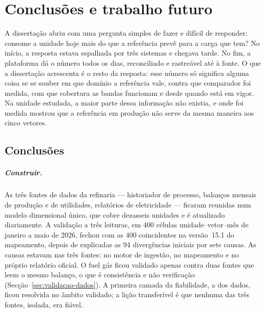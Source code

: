 
\chapter{Conclusões e trabalho futuro}
\label{cha:conclusoes}

A dissertação abriu com uma pergunta simples de fazer e difícil de
responder: consome a unidade hoje mais do que a referência prevê para a carga
que tem? No início, a resposta estava espalhada por três sistemas e chegava
tarde. No fim, a plataforma dá o número todos os dias, reconciliado e
rastreável até à fonte. O que a dissertação acrescenta é o resto da resposta:
esse número só significa alguma coisa se se souber em que domínio a
referência vale, contra que comparador foi medida, com que cobertura as
bandas funcionam e desde quando está em vigor. Na unidade estudada, a maior
parte dessa informação não existia, e onde foi medida mostrou que a
referência em produção não serve da mesma maneira aos cinco vetores.

\section{Conclusões}
\label{sec:conclusoes}

\paragraph{Construir.} As três fontes de dados da refinaria --- historiador
de processo, balanços mensais de produção e de utilidades, relatórios de
eletricidade --- ficaram reunidas num modelo dimensional único, que cobre
dezasseis unidades e é atualizado diariamente. A validação a três leituras,
em 400 células unidade--vetor--mês de janeiro a maio de 2026, fechou com as
400 coincidentes na versão~15.1 do mapeamento, depois de explicadas as 94
divergências iniciais por sete causas. As causas estavam nas três fontes: no
motor de ingestão, no mapeamento e no próprio relatório oficial. O fuel gás
ficou validado apenas contra duas fontes que leem o mesmo balanço, o que é
consistência e não verificação (Secção~\ref{sec:validacao-dados}). A
primeira camada da fiabilidade, a dos dados, ficou resolvida no âmbito
validado; a lição transferível é que nenhuma das três fontes, isolada, era
fiável.

